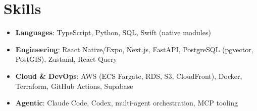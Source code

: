 \documentclass[letterpaper,11pt]{article}
\newcommand{\resumeItem}[2]{
  \item\small{
    \textbf{#1}{: #2 \vspace{-2pt}}
  }
}
\newcommand{\resumeSubItem}[2]{\resumeItem{#1}{#2}\vspace{-4pt}}
\newcommand{\resumeSubHeadingListStart}{\begin{itemize}[leftmargin=*]}
\newcommand{\resumeSubHeadingListEnd}{\end{itemize}}
\begin{document}
\section{Skills}
 \resumeSubHeadingListStart
   \resumeSubItem{Languages}{TypeScript, Python, SQL, Swift (native modules)}
   \resumeSubItem{Engineering}{React Native/Expo, Next.js, FastAPI, PostgreSQL (pgvector, PostGIS), Zustand, React Query}
   \resumeSubItem{Cloud \& DevOps}{AWS (ECS Fargate, RDS, S3, CloudFront), Docker, Terraform, GitHub Actions, Supabase}
   \resumeSubItem{Agentic}{Claude Code, Codex, multi-agent orchestration, MCP tooling}
 \resumeSubHeadingListEnd
\end{document}
